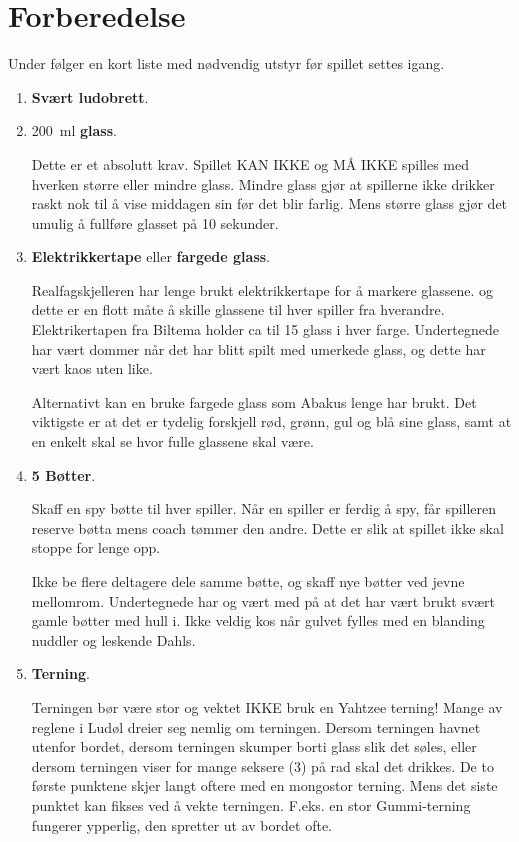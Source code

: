 \documentclass[10pt,a4paper,norsk,openany]{book}
\begin{document}
\chapter{Forberedelse}

Under følger en kort liste med nødvendig utstyr før spillet settes igang.

\begin{enumerate}

  \item \textbf{Svært ludobrett}.

  \item \SI{200}{\ml} \textbf{glass}.

    Dette er et absolutt krav. Spillet KAN IKKE og MÅ IKKE spilles med hverken
    større eller mindre glass. Mindre glass gjør at spillerne ikke drikker raskt
    nok til å vise middagen sin før det blir farlig. Mens større glass gjør det
    umulig å fullføre glasset på 10 sekunder.

  \item \textbf{Elektrikkertape} eller \textbf{fargede glass}.

    Realfagskjelleren har lenge brukt elektrikkertape for å markere glassene.
    og dette er en flott måte å skille glassene til hver spiller fra hverandre.
    Elektrikertapen fra Biltema holder ca til 15 glass i hver farge. 
    Undertegnede har vært dommer når det har blitt spilt med umerkede glass, og
    dette har vært kaos uten like.

    Alternativt kan en bruke fargede glass som Abakus lenge har brukt. Det
    viktigste er at det er tydelig forskjell rød, grønn, gul og blå sine glass,
    samt at en enkelt skal se hvor fulle glassene skal være.

  \item \textbf{5 Bøtter}.

    Skaff en spy bøtte til hver spiller. Når en spiller er ferdig å spy, får
    spilleren reserve bøtta mens coach tømmer den andre. Dette er slik at
    spillet ikke skal stoppe for lenge opp.

    Ikke be flere deltagere dele samme bøtte, og skaff nye bøtter ved jevne
    mellomrom. Undertegnede har og vært med på at det har vært brukt svært gamle
    bøtter med hull i. Ikke veldig kos når gulvet fylles
    med en blanding nuddler og leskende Dahls.

  \item \textbf{Terning}.

    Terningen bør være stor og vektet IKKE bruk en Yahtzee terning! Mange av
    reglene i Ludøl dreier seg nemlig om terningen. Dersom terningen havnet
    utenfor bordet, dersom terningen skumper borti glass slik det søles, eller
    dersom terningen viser for mange seksere (3) på rad skal det drikkes. De to
    første punktene skjer langt oftere med en mongostor terning. Mens det siste
    punktet kan fikses ved å vekte terningen. F.eks. en stor Gummi-terning
    fungerer ypperlig, den spretter ut av bordet ofte.


\end{enumerate}
\end{document}
